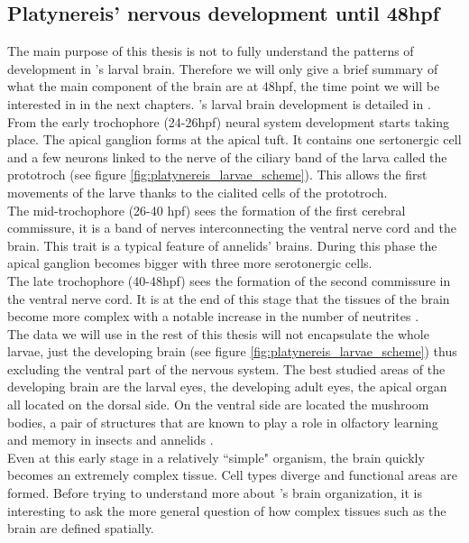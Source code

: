      \subsection{Platynereis' nervous development until 48hpf}
     The main purpose of this thesis is not to fully understand the patterns of development in \platy{}'s larval brain. Therefore we will only give a brief summary of what the main component of the brain are at 48hpf, the time point we will be interested in in the next chapters. \platy{}'s larval brain development is detailed in \cite{Fischer10}.\\
     From the early trochophore (24-26hpf) neural system development starts taking place. The apical ganglion forms at the apical tuft. It contains one sertonergic cell and a few neurons linked to the nerve of the ciliary band of the larva called the prototroch (see figure \ref{fig:platynereis_larvae_scheme}). This allows the first movements of the larve thanks to the cialited cells of the prototroch.\\
     The mid-trochophore (26-40 hpf) sees the formation of the first cerebral commissure, it is a band of nerves interconnecting the ventral nerve cord and the brain. This trait is a typical feature of annelids' brains. During this phase the apical ganglion becomes bigger with three more serotonergic cells.\\
     The late trochophore (40-48hpf) sees the formation of the second commissure in the ventral nerve cord. It is at the end of this stage that the tissues of the brain become more complex with a notable increase in the number of neutrites \cite{Fischer10}.\\
     The data we will use in the rest of this thesis will not encapsulate the whole larvae, just the developing brain (see figure \ref{fig:platynereis_larvae_scheme}) thus excluding the ventral part of the nervous system. The best studied areas of the developing brain are the larval eyes, the developing adult eyes, the apical organ all located on the dorsal side. On the ventral side are located the mushroom bodies, a pair of structures that are known to play a role in olfactory learning and memory in insects and annelids \cite{Tomer10}.\\
     
     Even at this early stage in a relatively ``simple" organism, the brain quickly becomes an extremely complex tissue. Cell types diverge and functional areas are formed. Before trying to understand more about \platy{}'s brain organization, it is interesting to ask the more general question of how complex tissues such as the brain are defined spatially.
     
